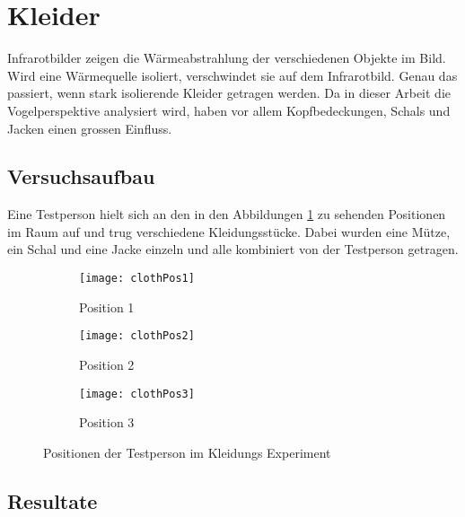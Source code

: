\section{Kleider}
\label{sec:cloths}

Infrarotbilder zeigen die Wärmeabstrahlung der verschiedenen Objekte im Bild. Wird eine Wärmequelle isoliert, verschwindet sie auf dem Infrarotbild. Genau das passiert, wenn stark isolierende Kleider getragen werden. Da in dieser Arbeit die Vogelperspektive analysiert wird, haben vor allem Kopfbedeckungen, Schals und Jacken einen grossen Einfluss. 

\subsection{Versuchsaufbau}

Eine Testperson hielt sich an den in den Abbildungen \ref{fig:clothPositions} zu sehenden Positionen im Raum auf und trug verschiedene Kleidungsstücke. Dabei wurden eine Mütze, ein Schal und eine Jacke einzeln und alle kombiniert von der Testperson getragen.

\begin{figure}[H]
	\centering
	\begin{subfigure}{.45\linewidth}
		\centering
		\texttt{[image: clothPos1]}
		\caption{Position 1}
	\end{subfigure}
	\begin{subfigure}{.45\linewidth}
		\centering
		\texttt{[image: clothPos2]}
		\caption{Position 2}
	\end{subfigure}
	\begin{subfigure}{.45\linewidth}
		\centering
		\texttt{[image: clothPos3]}
		\caption{Position 3}
	\end{subfigure}
	\caption{Positionen der Testperson im Kleidungs Experiment}
	\label{fig:clothPositions}
\end{figure}

\subsection{Resultate}

